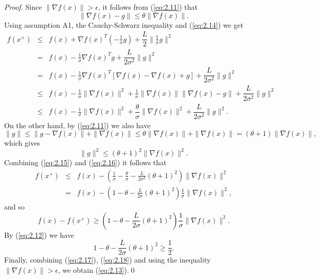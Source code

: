 \documentclass[10pt,a4paper]{amsart}
\begin{document}
\begin{proof}
Since $\|\nabla f(x)\|>\epsilon$, it follows from (\ref{eq:2.11}) that
\begin{equation}
\|\nabla f(x)-g\|\leq\theta\|\nabla f(x)\|.
\label{eq:2.14}
\end{equation}
Using assumption A1, the Cauchy-Schwarz inequality and (\ref{eq:2.14}) we get
\begin{eqnarray}
f(x^{+})&\leq & f(x)+\nabla f(x)^{T}\left(-\frac{1}{\sigma}g\right)+\dfrac{L}{2}\|\frac{1}{\sigma}g\|^{2}\nonumber\\
            & =   & f(x)-\frac{1}{\sigma}\nabla f(x)^{T}g+\dfrac{L}{2\sigma^{2}}\|g\|^{2}\nonumber\\
            &  =  & f(x)-\frac{1}{\sigma}\nabla f(x)^{T}\left[\nabla f(x)-\nabla f(x)+g\right]+\dfrac{L}{2\sigma^{2}}\|g\|^{2}\nonumber\\
            &\leq & f(x)-\frac{1}{\sigma}\|\nabla f(x)\|^{2}+\frac{1}{\sigma}\|\nabla f(x)\|\|\nabla f(x)-g\|+\dfrac{L}{2\sigma^{2}}\|g\|^{2}\nonumber\\
            &\leq & f(x)-\frac{1}{\sigma}\|\nabla f(x)\|^{2}+\dfrac{\theta}{\sigma}\|\nabla f(x)\|^{2}+\dfrac{L}{2\sigma^{2}}\|g\|^{2}.
\label{eq:2.15}
\end{eqnarray}
On the other hand, by (\ref{eq:2.11}) we also have
\begin{equation*}
\|g\|\leq \|g-\nabla f(x)\|+\|\nabla f(x)\|\leq\theta\|\nabla f(x)\|+\|\nabla f(x)\|=(\theta+1)\|\nabla f(x)\|,
\end{equation*}
which gives
\begin{equation}
\|g\|^{2}\leq (\theta +1)^{2}\|\nabla f(x)\|^{2}.
\label{eq:2.16}
\end{equation}
Combining (\ref{eq:2.15}) and (\ref{eq:2.16}) it follows that
\begin{eqnarray*}
f(x^{+})&\leq & f(x)-\left(\frac{1}{\sigma}-\frac{\theta}{\sigma}-\frac{L}{2\sigma^{2}}(\theta+1)^{2}\right)\|\nabla f(x)\|^{2}\\
            & =   &f(x)-\left(1-\theta-\frac{L}{2\sigma}(\theta+1)^{2}\right)\frac{1}{\sigma}\|\nabla f(x)\|^{2},
\end{eqnarray*}
and so
\begin{equation}
f(x)-f(x^{+})\geq \left(1-\theta-\frac{L}{2\sigma}(\theta+1)^{2}\right)\frac{1}{\sigma}\|\nabla f(x)\|^{2}.
\label{eq:2.17}
\end{equation}
By (\ref{eq:2.12}) we have
\begin{equation}
1-\theta-\frac{L}{2\sigma}(\theta+1)^{2}\geq\dfrac{1}{2}.
\label{eq:2.18}
\end{equation}
Finally, combining (\ref{eq:2.17}), (\ref{eq:2.18}) and using the inequality $\|\nabla f(x)\|>\epsilon$, we obtain (\ref{eq:2.13}).\qed
\end{proof}
\end{document}
